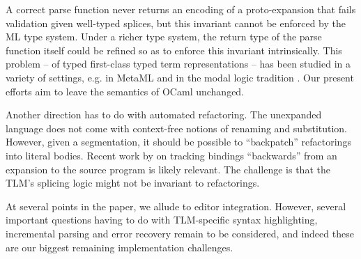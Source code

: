 \documentclass[acmsmall,review,anonymous]{acmart}\settopmatter{printfolios=true,printccs=false,printacmref=false}
\newcommand{\li}[1]{\lstinline[basicstyle=\ttfamily\fontsize{9pt}{1em}\selectfont]{#1}}
\begin{document}

A correct parse function never returns an encoding of a proto-expansion that fails validation given well-typed splices, but this invariant cannot be enforced by the ML type system.
Under a
richer type system, the return type of the parse function itself could be refined so as to
enforce this invariant intrinsically. This problem -- of typed first-class typed term representations -- has been studied in a variety of settings, e.g. in MetaML \cite{Sheard:1999:UMS} and in the modal logic tradition \cite{DBLP:conf/popl/DaviesP96}. %
 Our present efforts aim to leave the semantics of OCaml unchanged.

Another direction has to do with automated refactoring. The unexpanded language does not come with context-free notions of renaming and substitution. However, given a segmentation, it should be possible to ``backpatch'' refactorings into literal bodies. Recent work by \citet{wand2017inferring} on tracking bindings ``backwards'' from an expansion to the source program is likely relevant. The challenge is that the TLM's splicing logic might not be invariant to refactorings.

At several points in the paper, we allude to editor integration. However, several important questions having to do with TLM-specific syntax highlighting, incremental parsing and error recovery \cite{graham1979practical} remain to be considered, and indeed these are our biggest remaining implementation challenges. %
\end{document}
